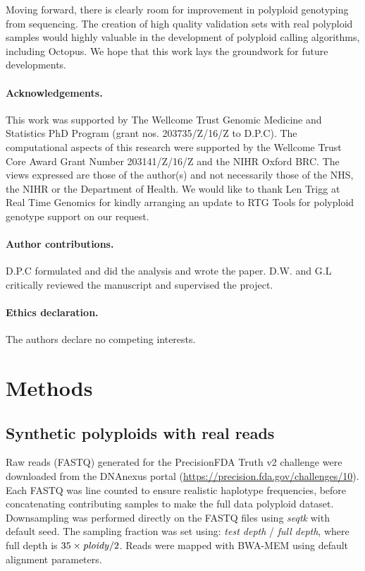 \documentclass[notitlepage, twocolumn, 10pt]{article}
\begin{document}
Moving forward, there is clearly room for improvement in polyploid genotyping from sequencing. The creation of high quality validation sets with real polyploid samples would highly valuable in the development of polyploid calling algorithms, including Octopus. We hope that this work lays the groundwork for future developments.

\paragraph*{Acknowledgements.} This work was supported by The Wellcome Trust Genomic Medicine and Statistics PhD Program (grant nos. 203735/Z/16/Z to D.P.C). The computational aspects of this research were supported by the Wellcome Trust Core Award Grant Number 203141/Z/16/Z and the NIHR Oxford BRC. The views expressed are those of the author(s) and not necessarily those of the NHS, the NIHR or the Department of Health. We would like to thank Len Trigg at Real Time Genomics for kindly arranging an update to RTG Tools for polyploid genotype support on our request.

\paragraph*{Author contributions.} D.P.C formulated and did the analysis and wrote the paper. D.W. and G.L critically reviewed the manuscript and supervised the project.

\paragraph*{Ethics declaration.} The authors declare no competing interests.




\section*{Methods}\small

\subsection*{Synthetic polyploids with real reads} Raw reads (FASTQ) generated for the PrecisionFDA Truth v2 challenge \cite{RN809} were downloaded from the DNAnexus portal (\url{https://precision.fda.gov/challenges/10}). Each FASTQ was line counted to ensure realistic haplotype frequencies, before concatenating contributing samples to make the full data polyploid dataset. Downsampling was performed directly on the FASTQ files using \emph{seqtk} with default seed. The sampling fraction was set using: \emph{test depth} / \emph{full depth}, where full depth is $35 \times \text{\emph{ploidy}} / 2$. Reads were mapped with BWA-MEM using default alignment parameters.
\end{document}
